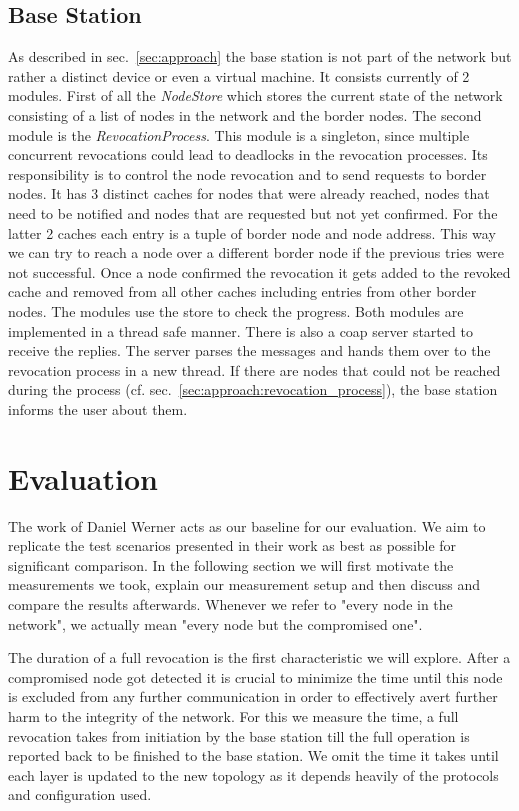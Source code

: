 \documentclass[conference]{IEEEtran}
\begin{document}
\subsection{Base Station}\label{sec:implementation:base_station}
As described in sec.~\ref{sec:approach} the base station is not part of the network but rather a distinct device or even a virtual machine.
It consists currently of 2 modules.
First of all the \textit{NodeStore} which stores the current state of the network consisting of a list of nodes in the network and the border nodes.
The second module is the \textit{RevocationProcess}. 
This module is a singleton, since multiple concurrent revocations could lead to deadlocks in the revocation processes.
Its responsibility is to control the node revocation and to send requests to border nodes. 
It has 3 distinct caches for nodes that were already reached, nodes that need to be notified and nodes that are requested but not yet confirmed.
For the latter 2 caches each entry is a tuple of border node and node address.
This way we can try to reach a node over a different border node if the previous tries were not successful.
Once a node confirmed the revocation it gets added to the revoked cache and removed from all other caches including entries from other border nodes.
The modules use the store to check the progress.
Both modules are implemented in a thread safe manner.
There is also a \ac{coap} server started to receive the replies.
The server parses the messages and hands them over to the revocation process in a new thread.
If there are nodes that could not be reached during the process (cf. sec.~\ref{sec:approach:revocation_process}), the base station informs the user about them.

\section{Evaluation}\label{sec:evaluation}
The work of Daniel Werner \cite{DanielWerner} acts as our baseline for our evaluation. 
We aim to replicate the test scenarios presented in their work as best as possible for significant comparison. 
In the following section we will first motivate the measurements we took, explain our measurement setup and then discuss and compare the results afterwards. 
Whenever we refer to "every node in the network", we actually mean "every node but the compromised one".

The duration of a full revocation is the first characteristic we will explore. 
After a compromised node got detected it is crucial to minimize the time until this node is excluded from any further communication in order to effectively avert further harm to the integrity of the network. 
For this we measure the time, a full revocation takes from initiation by the base station till the full operation is reported back to be finished to the base station.
We omit the time it takes until each layer is updated to the new topology as it depends heavily of the protocols and configuration used.
\end{document}
